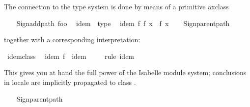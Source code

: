 \begin{isabellebody}
\begin{isamarkuptext}
\noindent The connection to the type system is done by means
  of a primitive axclass%
\end{isamarkuptext}%
\isamarkuptrue%
%
\isadeliminvisible
\ %
\endisadeliminvisible
%
\isataginvisible
{}\isamarkupfalse%
\ {\isacharverbatimopen}\ Sign{\isachardot}add{\isacharunderscore}path\ {\isachardoublequote}foo{\isachardoublequote}\ {\isacharverbatimclose}%
\endisataginvisible
{\isafoldinvisible}%
%
\isadeliminvisible
%
\endisadeliminvisible
\isanewline
%
\isadelimquote
\isanewline
%
\endisadelimquote
%
\isatagquote
{}\isamarkupfalse%
\ idem\ {\isacharless}\ type\isanewline
\ \ idem{\isacharcolon}\ {\isachardoublequoteopen}f\ {\isacharparenleft}f\ x{\isacharparenright}\ {\isacharequal}\ f\ x{\isachardoublequoteclose}%
\endisatagquote
{\isafoldquote}%
%
\isadelimquote
%
\endisadelimquote
%
\isadeliminvisible
\ %
\endisadeliminvisible
%
\isataginvisible
{}\isamarkupfalse%
\ {\isacharverbatimopen}\ Sign{\isachardot}parent{\isacharunderscore}path\ {\isacharverbatimclose}%
\endisataginvisible
{\isafoldinvisible}%
%
\isadeliminvisible
%
\endisadeliminvisible
%
\begin{isamarkuptext}%
\noindent together with a corresponding interpretation:%
\end{isamarkuptext}%
\isamarkuptrue%
%
\isadelimquote
%
\endisadelimquote
%
\isatagquote
{}\isamarkupfalse%
\ idem{\isacharunderscore}class{\isacharcolon}\isanewline
\ \ idem\ {\isachardoublequoteopen}f\ {\isasymColon}\ {\isacharparenleft}{\isasymalpha}{\isasymColon}idem{\isacharparenright}\ {\isasymRightarrow}\ {\isasymalpha}{\isachardoublequoteclose}\isanewline
{}\isamarkupfalse%
\ \isamarkupfalse%
\ {\isacharparenleft}rule\ idem{\isacharparenright}%
\endisatagquote
{\isafoldquote}%
%
\isadelimquote
%
\endisadelimquote
%
\begin{isamarkuptext}%
\noindent This gives you at hand the full power of the Isabelle module system;
  conclusions in locale  are implicitly propagated
  to class .%
\end{isamarkuptext}%
\isamarkuptrue%
%
\isadeliminvisible
\ %
\endisadeliminvisible
%
\isataginvisible
{}\isamarkupfalse%
\ {\isacharverbatimopen}\ Sign{\isachardot}parent{\isacharunderscore}path\ {\isacharverbatimclose}%
\endisataginvisible
{\isafoldinvisible}%
%
\isadeliminvisible
%
\endisadeliminvisible
%
\isamarkuptrue%
%
\begin{isamarkuptext}%

\end{isamarkuptext}
\end{isabellebody}

